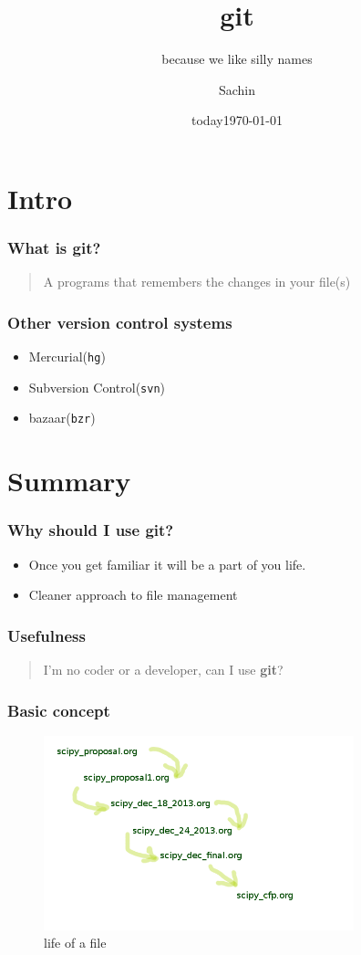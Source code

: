 \documentclass[bigger, presentation]{beamer}
\date{today}
\subtitle{because we like silly names}
\institute{Indian Institute of Technology Bombay}
\title{git}
\author{Sachin}
\date{\today}
\begin{document}
\maketitle

\section{Intro}
\label{sec-1}
\begin{frame}
\frametitle{What is git?}
\label{sec-1-1}

\begin{quote}
A programs that remembers the changes in your file(s)
\end{quote}
\end{frame}
\begin{frame}
\frametitle{Other version control systems}
\label{sec-1-2}

\begin{itemize}
\item Mercurial(\texttt{hg})
\item Subversion Control(\texttt{svn})
\item bazaar(\texttt{bzr})
\end{itemize}
\end{frame}
\section{Summary}
\label{sec-2}
\begin{frame}
\frametitle{Why should I use git?}
\label{sec-2-1}

\begin{itemize}
\item Once you get familiar it will be a part of you life.
\item Cleaner approach to file management
\end{itemize}
\end{frame}
\begin{frame}
\frametitle{Usefulness}
\label{sec-2-2}

\begin{quote}
I'm no coder or a developer, can I use \textbf{git}?
\end{quote}

     
\end{frame}
\begin{frame}
\frametitle{Basic concept}
\label{sec-2-3}

   \begin{figure}[htb]
   \centering
   \includegraphics[width=9cm,angle=0]{./concept.png}
   \caption{\label{fig:life-of-file}life of a file}
   \end{figure}
\end{frame}
\end{document}
